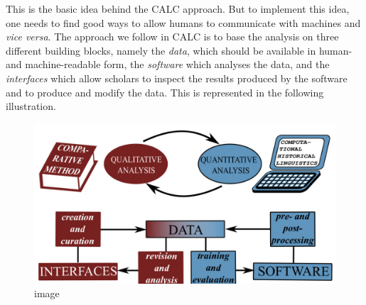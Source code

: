This is the basic idea behind the CALC approach. But to implement this
idea, one needs to find good ways to allow humans to communicate with
machines and \emph{vice versa}. The approach we follow in CALC is to
base the analysis on three different building blocks, namely the
\emph{data}, which should be available in human- and machine-readable
form, the \emph{software} which analyses the data, and the
\emph{interfaces} which allow scholars to inspect the results produced
by the software and to produce and modify the data. This is represented
in the following illustration.

\begin{figure}[htbp]
\centering
\includegraphics{img/s1-calc.png}
\caption{image}
\end{figure}

